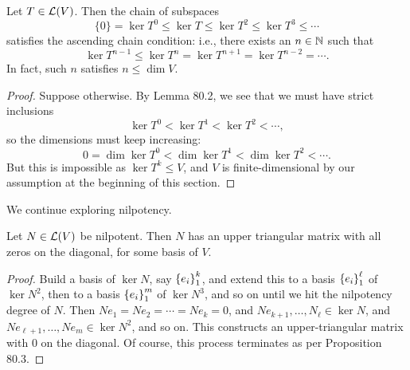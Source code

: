 \documentclass{article}
\begin{document}
\begin{proposition}
Let $T\in\mathcal L(V)$. Then the chain of subspaces
$$\{0\} = \ker T^0 \leq \ker T\leq \ker T^2 \leq \ker T^3 \leq \cdots$$
satisfies the {ascending chain condition}: i.e., there exists an $n\in\mathbb N$ such that
$$\ker T^{n-1}\leq \ker T^n = \ker T^{n+1} = \ker T^{n-2} = \cdots.$$
In fact, such $n$ satisfies $n \leq \dim V$.
\end{proposition}
\begin{proof}
Suppose otherwise. By Lemma 80.2, we see that we must have strict inclusions
$$\ker T^0 < \ker T^1 < \ker T^2 < \cdots,$$
so the dimensions must keep increasing:
$$0 = \dim\ker T^0 < \dim \ker T^1 < \dim \ker T^2 < \cdots.$$
But this is impossible as $\ker T^k \leq V$, and $V$ is finite-dimensional by our assumption at the beginning of this section.
\end{proof}

We continue exploring nilpotency.
\begin{lemma}
Let $N\in\mathcal L(V)$ be nilpotent. Then $N$ has an upper triangular matrix with all zeros on the diagonal, for some basis of $V$.
\end{lemma}
\begin{proof}
Build a basis of $\ker N$, say $\left\{e_i\right\}_1^k$, and extend this to a basis $\left\{e_i\right\}_1^\ell$ of $\ker N^2$, then to a basis $\left\{e_i\right\}_1^m$ of $\ker N^3$, and so on until we hit the nilpotency degree of $N$. Then $Ne_1 = Ne_2 = \cdots = Ne_k = 0$, and $Ne_{k+1}, \ldots, N_\ell \in \ker N$, and $Ne_{\ell+1}, \ldots, Ne_m\in \ker N^2$, and so on. This constructs an upper-triangular matrix with $0$ on the diagonal. Of course, this process terminates as per Proposition 80.3.
\end{proof}
\end{document}
